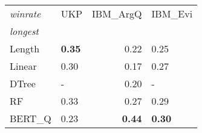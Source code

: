 \begin{tabular}{llrl}
\toprule
\textit{winrate} &   UKP &  IBM\_ArgQ & IBM\_Evi \\
\textit{longest}  &       &           &         \\
\midrule
Length &  \textbf{0.35} &      0.22 &    0.25 \\
Linear &   0.30 &      0.17 &    0.27 \\
DTree  &     - &      0.20 &       - \\
RF     &  0.33 &      0.27 &    0.29 \\
BERT\_Q &  0.23 &      \textbf{0.44} &     \textbf{0.30} \\
\bottomrule
\end{tabular}
